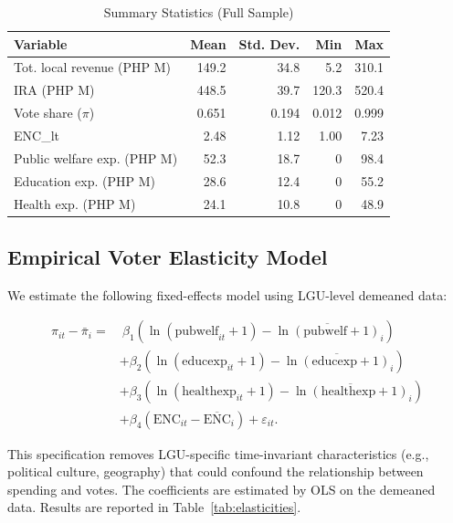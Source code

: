 \documentclass[twocolumn]{article}
\begin{document}
\begin{table}[ht]
\centering
\caption{Summary Statistics (Full Sample)}
\label{tab:summary}
\small
\begin{tabular}{lrrrr}
\toprule
Variable & Mean & Std. Dev. & Min & Max \\
\midrule
Tot. local revenue (PHP M) & 149.2 & 34.8 & 5.2 & 310.1 \\
IRA (PHP M) & 448.5 & 39.7 & 120.3 & 520.4 \\
Vote share ($\pi$) & 0.651 & 0.194 & 0.012 & 0.999 \\
ENC\_lt & 2.48 & 1.12 & 1.00 & 7.23 \\
Public welfare exp. (PHP M) & 52.3 & 18.7 & 0 & 98.4 \\
Education exp. (PHP M) & 28.6 & 12.4 & 0 & 55.2 \\
Health exp. (PHP M) & 24.1 & 10.8 & 0 & 48.9 \\
\bottomrule
\end{tabular}
\end{table}

\subsection{Empirical Voter Elasticity Model}

We estimate the following fixed-effects model using LGU-level demeaned data:

\begin{equation}
\begin{aligned}
\pi_{it} - \bar{\pi}_i = &\ \beta_1 \left(\ln(\text{pubwelf}_{it}+1) - \overline{\ln(\text{pubwelf}+1)}_i\right) \\
&+ \beta_2 \left(\ln(\text{educexp}_{it}+1) - \overline{\ln(\text{educexp}+1)}_i\right) \\
&+ \beta_3 \left(\ln(\text{healthexp}_{it}+1) - \overline{\ln(\text{healthexp}+1)}_i\right) \\
&+ \beta_4 \left(\text{ENC}_{it} - \overline{\text{ENC}}_i\right) + \varepsilon_{it}.
\end{aligned}
\end{equation}

This specification removes LGU-specific time-invariant characteristics (e.g., political culture, geography) that could confound the relationship between spending and votes. The coefficients are estimated by OLS on the demeaned data. Results are reported in Table~\ref{tab:elasticities}.
\end{document}
